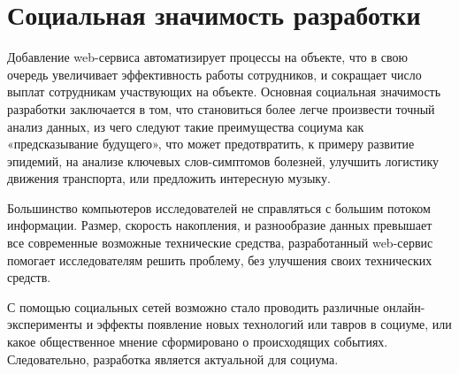\section{Социальная значимость разработки}
Добавление web-сервиса автоматизирует процессы на объекте, что в свою очередь увеличивает эффективность работы сотрудников, и сокращает число выплат сотрудникам участвующих на объекте. Основная социальная значимость разработки заключается в том, что становиться более легче произвести точный анализ данных, из чего следуют такие преимущества социума как «предсказывание будущего», что может предотвратить, к примеру развитие эпидемий, на анализе ключевых слов-симптомов болезней, улучшить логистику движения транспорта, или предложить интересную музыку. 

Большинство компьютеров исследователей не справляться с большим потоком информации. Размер, скорость накопления, и разнообразие данных превышает все современные возможные технические средства, разработанный web-сервис помогает исследователям решить проблему, без улучшения своих технических средств.  

С помощью социальных сетей возможно стало проводить различные онлайн-эксперименты и эффекты появление новых технологий или тавров в социуме, или какое общественное мнение сформировано о происходящих событиях.  
Следовательно, разработка является актуальной для социума.

\pagebreak
